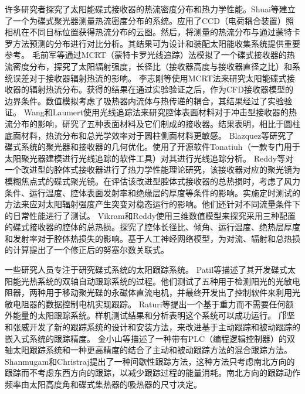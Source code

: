 许多研究者探究了太阳能碟式接收器的热流密度分布和热力学性能。Shuai等\cite{Shuai2010}建立了一个为碟式聚光器测量热流密度分布的系统。应用了CCD（电荷耦合装置）照相机在不同目标位置获得热流分布的云图。然后，将测量的热流分布与通过蒙特卡罗方法预测的分布进行对比分析。其结果可为设计和装配太阳能收集系统提供重要参考。
毛前军等\cite{Mao2014b}通过MCRT（蒙特卡罗光线追踪）法模拟了一个碟式接收器的热流密度分布，探究了太阳辐射强度，长径比（接收器高度与接收器直径之比）和系统误差对于接收器辐射热流的影响。
李志刚等\cite{Li2011b}使用MCRT法来研究太阳能碟式接收器的辐射热流分布。获得的结果在通过实验验证之后，作为CFD接收器模型的边界条件。数值模拟考虑了吸热器内流体与热传递的耦合，其结果经过了实验验证。
Wang和Laumert\cite{Wang2017}使用光线追踪法来研究腔体表面材料对于冲击型接收器的热流分布的影响，研究了五种表面材料及它们制成的接收器。结果表明，相比于圆柱底面材料，热流分布和总光学效率对于圆柱侧面材料更敏感。
Blazquez等\cite{Blazquez2016}研究了碟式系统的聚光器和接收器的几何优化。使用了开源软件Tonatiuh（一款专门用于太阳聚光器建模进行光线追踪的软件工具）对其进行光线追踪分析。
Reddy等\cite{Reddy2015,Reddy2015b}对一个改进型的腔体式接收器进行了热力学性能理论研究，该接收器对应的聚光镜为模糊焦点式的碟式聚光镜。在评估该改进型腔体式接收器的总热损时，考虑了风力条件、运行温度、腔体表面发射率和绝缘层的厚度等条件的影响。实施定时测试的方法来应对太阳辐射强度产生突变对稳态运行的影响。他们还针对不同流量条件下的日常性能进行了测试。
Vikram和Reddy\cite{Vikram2015}使用三维数值模型来探究采用三种配置的碟式接收器的腔体的总热损。探究了腔体长径比、倾角、运行温度、绝热层厚度和发射率对于腔体热损失的影响。基于人工神经网络模型，为对流、辐射和总热损的计算提出了一个修正后的努塞尔数关联式。

一些研究人员专注于研究碟式系统的太阳跟踪系统。
Patil等\cite{Patil2016}描述了其开发碟式太阳能光热系统的双轴自动跟踪系统的过程。他们测试了五种用于检测阳光的光敏电阻器，两种用于移动聚光碟的永磁体直流电机，并最终开发出了控制软件来利用光敏电阻器的数据控制电机实现跟踪。
Raturi等\cite{Raturi2014}提出一个基于重力而不需要任何额外能量的太阳跟踪系统。样机测试结果和分析表明这个系统可以成功运行。
邝坚和张威\cite{Kuang2012}开发了新的跟踪系统的设计和安装方法，来改进基于主动跟踪和被动跟踪的嵌入式系统的跟踪精度。
金小山等\cite{Jin2013}描述了一种带有PLC（编程逻辑控制器）的双轴太阳跟踪系统和一种更高精度的结合了主动和被动跟踪方法的混合跟踪方法。
Shanmugam和Christraj\cite{Shanmugam2005}提出了一种间歇性跟踪方法，这种方法只考虑南北方向的跟踪而不考虑东西方向的跟踪，以减少跟踪过程的能量消耗。南北方向的跟踪动作频率由太阳高度角和碟式集热器的吸热器的尺寸决定。

